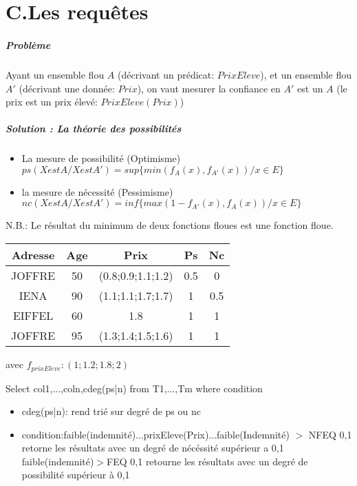 \documentclass[10pt,a4paper]{report}
\begin{document}
\chapter{C.Les requêtes}
\paragraph{Problème\\}

Ayant un ensemble flou $ A $ (décrivant un prédicat: $PrixEleve$), et un ensemble flou $ A' $   (décrivant une donnée: $Prix$), on vaut mesurer la confiance en  $ A' $ est un $ A $ (le prix est un prix élevé: $PrixEleve(Prix)$)

\paragraph{Solution : La théorie des possibilités\\}
\begin{itemize}
\item La mesure de possibilité (Optimisme)\\
$ ps(X est A / Xest A')=sup\{min(f_A(x),f_{A'}(x)) / x \in E\} $
\item la mesure de nécessité (Pessimisme)\\
$ nc(X est A / X est A')=inf \{max(1-f_{A'}(x), f_A(x)) / x \in E\} $
\end{itemize}
N.B.: Le résultat du minimum de deux fonctions floues est une fonction floue.
\begin{tabular}{|c|c|c|c|c|}
\hline 
Adresse & Age & Prix & Ps & Nc \\ 
\hline 
JOFFRE & 50 & (0.8;0.9;1.1;1.2) & 0.5 & 0 \\ 
\hline 
IENA & 90 & (1.1;1.1;1.7;1.7) & 1 & 0.5  \\ 
\hline 
EIFFEL & 60 & 1.8 & 1 & 1  \\ 
\hline 
JOFFRE & 95 & (1.3;1.4;1.5;1.6) & 1 & 1  \\ 
\hline 
\end{tabular} 

avec $f_{prixEleve}:(1;1.2;1.8;2)$


Select col1,...,coln,cdeg(ps|n)
from T1,...,Tm
where condition

\begin{itemize}
\item cdeg(ps|n): rend trié sur degré de ps ou nc
\item condition:faible(indemnité)...prixEleve(Prix)...faible(Indemnité) $>$ NFEQ 0,1 retorne les résultats avec un degré de nécéssité supérieur a 0,1\\
faible(indemnité)$>$FEQ 0,1 retourne les résultats avec un degré de possibilité supérieur à 0,1
\end{itemize}
\end{document}
